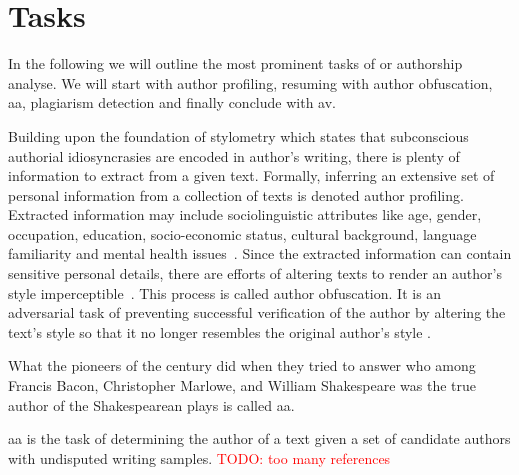 \section{Tasks}

In the following we will outline the most prominent tasks of \ai{} or authorship analyse.
We will start with author profiling, resuming with author obfuscation, \ac{aa}, plagiarism detection and finally conclude with \ac{av}.

Building upon the foundation of stylometry which states that subconscious authorial idiosyncrasies are encoded in author's writing, there is plenty of information to extract from a given text.
Formally, inferring an extensive set of personal information from a collection of texts is denoted author profiling.
Extracted information may include sociolinguistic attributes like age, gender, occupation, education, socio-economic status, cultural background, language familiarity and mental health issues~\citep{emmery_adversarial_2021,stamatatos_survey_2009,elmanarelbouanani_authorship_2014}.
Since the extracted information can contain sensitive personal details, there are efforts of altering texts to render an author's style imperceptible~\citep{bischoff_importance_2020}.
This process is called author obfuscation.
It is an adversarial task of preventing successful verification of the author by altering the text's style so that it no longer resembles the original author's style \citep{bevendorff_divergence_based_2020,gohsen_task_oriented_2024}.

What the \ai{} pioneers of the  century did when they tried to answer who among Francis Bacon, Christopher Marlowe, and William Shakespeare was the true author of the Shakespearean plays is called \ac{aa}.

\begin{definition}
    [\acl{aa}]   
    \ac{aa} is the task of determining the author of a text given a set of candidate authors with undisputed writing samples.
    \textcolor{red}{TODO: too many references}
\end{definition}

